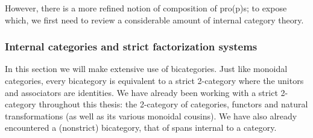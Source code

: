 However, there is a more refined notion of composition of pro(p)s; to expose which, we first need to review  a considerable amount of internal category theory.
\subsubsection{Internal categories and strict factorization systems}
In this section we will make extensive use of bicategories.  Just like monoidal categories, every bicategory is equivalent to a strict 2-category where the unitors and associators are identities.  We have already been working with a strict 2-category throughout this thesis: the 2-category of categories, functors and natural transformations (as well as its various monoidal cousins).   We have also already encountered a (nonstrict) bicategory, that of spans internal to a category.  

